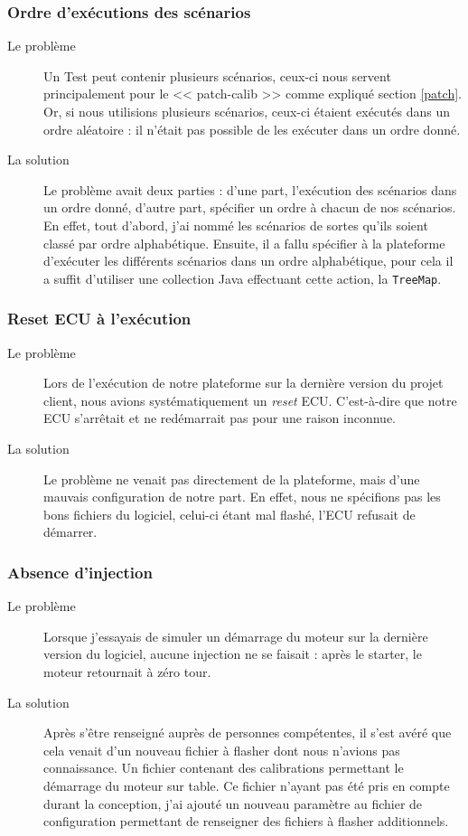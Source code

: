 	\subsubsection{Ordre d'exécutions des scénarios}
		\begin{description}
			\item[Le problème] Un Test peut contenir plusieurs scénarios, ceux-ci nous servent principalement pour le << patch-calib >> comme expliqué section \ref{patch}. Or, si nous utilisions plusieurs scénarios, ceux-ci étaient exécutés dans un ordre aléatoire : il n'était pas possible de les exécuter dans un ordre donné.
			\item[La solution] Le problème avait deux parties : d'une part, l'exécution des scénarios dans un ordre donné, d'autre part, spécifier un ordre à chacun de nos scénarios. En effet, tout d'abord, j'ai nommé les scénarios de sortes qu'ils soient classé par ordre alphabétique. Ensuite, il a fallu spécifier à la plateforme d'exécuter les différents scénarios dans un ordre alphabétique, pour cela il a suffit d'utiliser une collection Java effectuant cette action, la \texttt{TreeMap}.
	\end{description}
	
	\subsubsection{Reset ECU à l'exécution}
	\begin{description}
		\item[Le problème] Lors de l'exécution de notre plateforme sur la dernière version du projet client, nous avions systématiquement un \textit{reset} ECU. C'est-à-dire que notre ECU s'arrêtait et ne redémarrait pas pour une raison inconnue.
		\item[La solution] Le problème ne venait pas directement de la plateforme, mais d'une mauvais configuration de notre part. En effet, nous ne spécifions pas les bons fichiers du logiciel, celui-ci étant mal flashé, l'ECU refusait de démarrer.
	\end{description}
	
	\subsubsection{Absence d'injection}
	\begin{description}
		\item[Le problème] Lorsque j'essayais de simuler un démarrage du moteur sur la dernière version du logiciel, aucune injection ne se faisait : après le starter, le moteur retournait à zéro tour.
		\item[La solution] Après s'être renseigné auprès de personnes compétentes, il s'est avéré que cela venait d'un nouveau fichier à flasher dont nous n'avions pas connaissance. Un fichier contenant des calibrations permettant le démarrage du moteur sur table. Ce fichier n'ayant pas été pris en compte durant la conception, j'ai ajouté un nouveau paramètre au fichier de configuration permettant de renseigner des fichiers à flasher additionnels.
	\end{description}
	

